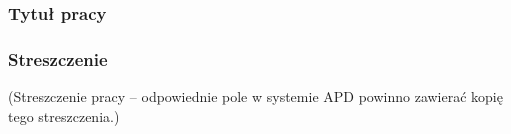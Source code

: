









\frontmatter



  

\cleardoublepage

\rmfamily\normalfont
\pagestyle{empty}


\subsubsection*{Tytuł pracy} 
\Title

\subsubsection*{Streszczenie}  
(Streszczenie pracy – odpowiednie pole w systemie APD powinno zawierać kopię tego streszczenia.)

